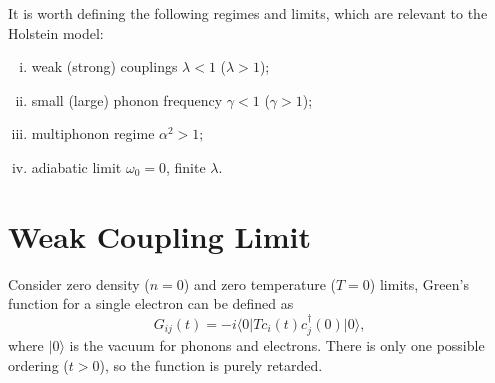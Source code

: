 \documentclass{book}
\newcommand{\bra}[1]{{\langle#1|}}
\newcommand{\ket}[1]{{|#1\rangle}}
\numberwithin{equation}{section}
\begin{document}
It is worth defining the following regimes and limits, which are relevant 
to the Holstein model:

\begin{enumerate}[(i)]
\item weak (strong) couplings $\lambda<1$ ($\lambda>1$);
\item small (large) phonon frequency $\gamma<1$ ($\gamma>1$);
\item multiphonon regime $\alpha^2>1$;
\item adiabatic limit $\omega_0=0$, finite $\lambda$.
\end{enumerate}

\section{Weak Coupling Limit}
Consider zero density ($n=0$) and zero temperature ($T=0$) limits,
Green's function for a single electron can be defined as
\begin{equation}
  G_{ij}(t)=-i\bra{0}Tc_i(t)c_j^\dag(0)\ket{0},
\end{equation}
where $\ket{0}$ is the vacuum for phonons and electrons. There is only
one possible ordering ($t>0$), so the function is purely retarded.
\end{document}
